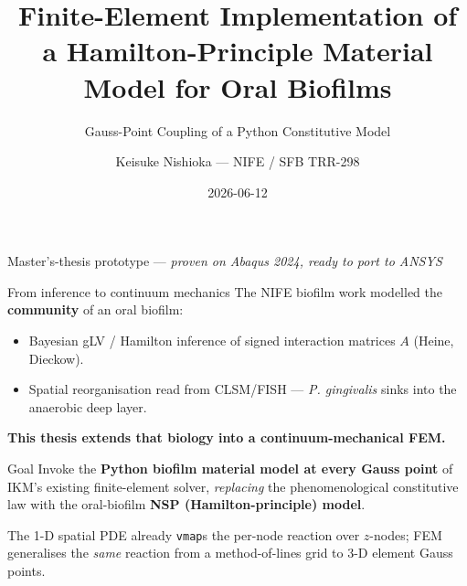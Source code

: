 \documentclass[aspectratio=169,xcolor=dvipsnames]{beamer}
\title[FE coupling of a Python biofilm material model]{Finite-Element Implementation of a Hamilton-Principle Material Model for Oral Biofilms}
\subtitle{Gauss-Point Coupling of a Python Constitutive Model}
\author{Keisuke Nishioka — NIFE / SFB TRR-298}
\institute{Examiners: Soleimani (1st) · Geisler (2nd) — PI: Junker — FEM framework: Felix (IKM)}
\date{2026-06-12}
\begin{document}
{
\begin{frame}[plain]
  \titlepage
  \begin{center}\small Master's-thesis prototype — \textit{proven on Abaqus 2024, ready to port to ANSYS}\end{center}
\end{frame}}

\begin{frame}{From inference to continuum mechanics}
The NIFE biofilm work modelled the \textbf{community} of an oral biofilm:
\begin{itemize}
  \item Bayesian gLV / Hamilton inference of signed interaction matrices $A$ (Heine, Dieckow).
  \item Spatial reorganisation read from CLSM/FISH — \textit{P. gingivalis} sinks into the anaerobic deep layer.
\end{itemize}
\vspace{0.4em}
\textbf{This thesis extends that biology into a continuum-mechanical FEM.}
\begin{block}{Goal}
Invoke the \textbf{Python biofilm material model at every Gauss point} of IKM's existing
finite-element solver, \textit{replacing} the phenomenological constitutive law with the
oral-biofilm \textbf{NSP (Hamilton-principle) model}.
\end{block}
\vspace{0.2em}
The 1-D spatial PDE already \texttt{vmap}s the per-node reaction over $z$-nodes; FEM
generalises the \emph{same} reaction from a method-of-lines grid to 3-D element Gauss points.
\end{frame}
\end{document}
